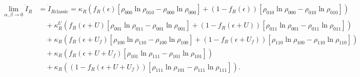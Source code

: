 \begin{appendixs}
\begin{align*}
 \lim_{\alpha,\beta \to 0}\dot{I}_{R}  &= \dot{I}_{R\text{classic}}   =
 \kappa_{R}\!\left(f_{R}(\epsilon)[\rho_{000}\ln \rho_{010} - \rho_{000}\ln \rho_{000}] + (1-f_{R}(\epsilon))[\rho_{010}\ln \rho_{000} - \rho_{010}\ln \rho_{010}] \right)  \\ 
      &\quad + \kappa^{U}_{R}\!\left(f_{R}(\epsilon + U)[\rho_{001}\ln \rho_{011} - \rho_{001}\ln \rho_{001}] + (1-f_{R}(\epsilon + U))[\rho_{011}\ln \rho_{001} -\rho_{011}\ln \rho_{011}] \right) \\  
      &\quad + \kappa_{R}\!\left( f_{R}(\epsilon + U_{f})[\rho_{100}\ln \rho_{110} -\rho_{100}\ln \rho_{100}] + (1-f_{R}(\epsilon + U_{f}))[\rho_{110}\ln \rho_{100} - \rho_{110}\ln \rho_{110}] \right) \\  
      &\quad + \kappa_{R}\!\left( f_{R}(\epsilon + U + U_{f})[\rho_{101}\ln \rho_{111}- \rho_{101}\ln \rho_{101}] \right) \\
      & \quad
      + \kappa_{R}\!\left( (1-f_{R}(\epsilon+U+U_{f}))[\rho_{111}\ln \rho_{101} - \rho_{111}\ln \rho_{111}] \right).
\end{align*}

\label{apendix5infoflow}


\end{appendixs}